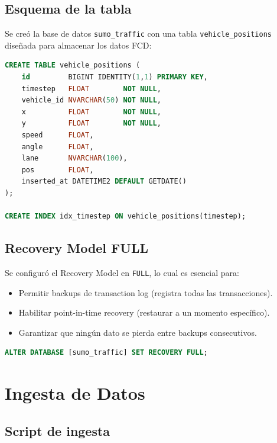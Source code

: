 \documentclass[12pt,a4paper]{article}
\begin{document}
\subsection{Esquema de la tabla}

Se cre\'o la base de datos \texttt{sumo\_traffic} con una tabla \texttt{vehicle\_positions} dise\~nada para almacenar los datos FCD:

\begin{lstlisting}[language=SQL,caption={Esquema de la tabla vehicle\_positions}]
CREATE TABLE vehicle_positions (
    id         BIGINT IDENTITY(1,1) PRIMARY KEY,
    timestep   FLOAT        NOT NULL,
    vehicle_id NVARCHAR(50) NOT NULL,
    x          FLOAT        NOT NULL,
    y          FLOAT        NOT NULL,
    speed      FLOAT,
    angle      FLOAT,
    lane       NVARCHAR(100),
    pos        FLOAT,
    inserted_at DATETIME2 DEFAULT GETDATE()
);

CREATE INDEX idx_timestep ON vehicle_positions(timestep);
\end{lstlisting}

\subsection{Recovery Model FULL}

Se configur\'o el Recovery Model en \texttt{FULL}, lo cual es esencial para:
\begin{itemize}
  \item Permitir backups de transaction log (registra todas las transacciones).
  \item Habilitar point-in-time recovery (restaurar a un momento espec\'ifico).
  \item Garantizar que ning\'un dato se pierda entre backups consecutivos.
\end{itemize}

\begin{lstlisting}[language=SQL]
ALTER DATABASE [sumo_traffic] SET RECOVERY FULL;
\end{lstlisting}

\section{Ingesta de Datos}

\subsection{Script de ingesta}
\end{document}
